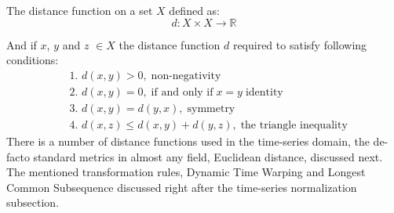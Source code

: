 The distance function on a set $X$ defined as:
\begin{equation}
 d: X \times X \rightarrow \mathbb{R}
\end{equation}

And if $x$, $y$ and $z$ $\in X$ the distance function $d$ required to satisfy following conditions:
\begin{align}
 & \text{1. } d(x, y) > 0, \; \text{non-negativity} \label{eq:d1} \\
 & \text{2. } d(x, y) = 0, \; \text{if and only if} \; x = y  \;  \text{identity} \\
 & \text{3. } d(x, y) = d(y, x), \; \text{symmetry} \\
 & \text{4. } d(x, z) \leq d(x, y) + d(y, z), \; \text{the triangle inequality} \label{eq:d4}
\end{align}
There is a number of distance functions used in the time-series domain, the de-facto standard metrics in almost any field, Euclidean distance, discussed next. The mentioned transformation rules, Dynamic Time Warping and Longest Common Subsequence discussed right after the time-series normalization subsection.
